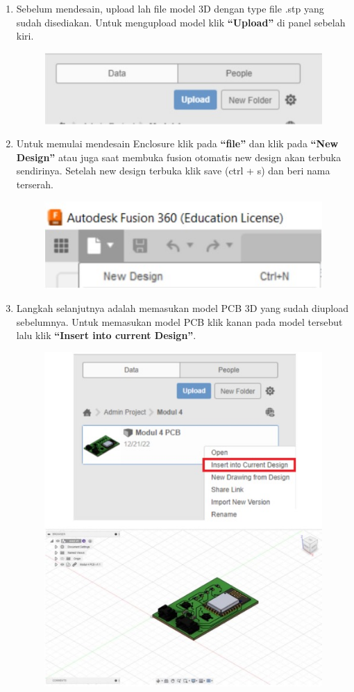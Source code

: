 \begin{enumerate}
    \item Sebelum mendesain, upload lah file model 3D dengan type file .stp yang sudah disediakan. Untuk
    mengupload model klik \textbf{“Upload”} di panel sebelah kiri.
        \begin{figure}[H]
            \centering
            \includegraphics[width=0.5\linewidth]{P3/img/image3.jpg}
        \end{figure}

    \item Untuk memulai mendesain Enclosure klik pada \textbf{“file”} dan klik pada \textbf{“New Design”} atau juga saat
    membuka fusion otomatis new design akan terbuka sendirinya. Setelah new design terbuka klik
    save (ctrl + s) dan beri nama terserah.
        \begin{figure}[H]
            \centering
            \includegraphics[width=0.5\linewidth]{P3/img/image4.jpg}
        \end{figure}

    \item Langkah selanjutnya adalah memasukan model PCB 3D yang sudah diupload sebelumnya. Untuk
    memasukan model PCB klik kanan pada model tersebut lalu klik \textbf{“Insert into current Design”}.
        \begin{figure}[H]
            \centering
            \includegraphics[width=0.5\linewidth]{P3/img/image5.jpg}
        \end{figure}


\end{enumerate}
